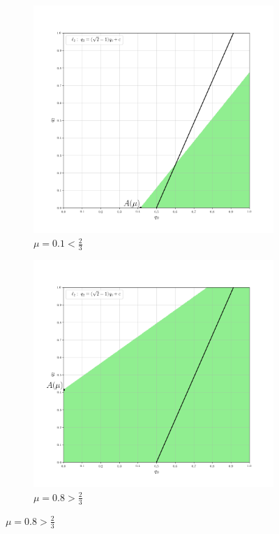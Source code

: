 \begin{flushleft}
	\begin{figure}[H]
    	\centering
     	\begin{subfigure}[b]{0.45 \textwidth}
        	\centering
        	\includegraphics[width=\textwidth]{images/graf_3_5}
        	\caption{$\mu=0.1 < \frac{2}{3}$}
         	\label{fig:y equals x}
     	\end{subfigure}
     	\hspace{10mm}
     	\begin{subfigure}[b]{0.45 \textwidth}
        	\centering
        	\includegraphics[width=\textwidth]{images/graf_3_6}
        	\caption{$\mu=0.8 > \frac{2}{3}$}
        	\label{fig:three sin x}
     	\end{subfigure}
	\end{figure}	
	

\end{flushleft}
